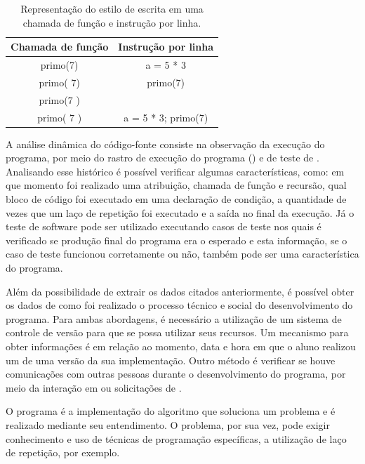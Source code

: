 			\begin{table}
				\centering
				\begin{tabular}{|c|c|}
					\hline
					Chamada de função & Instrução por linha \\ \hline
					primo(7)		  & a = 5 * 3  \\
					primo( 7)		 & primo(7)	 \\
					primo(7 )		 &	  \\
					primo( 7 )		& a = 5 * 3; primo(7)	\\
					\hline
				\end{tabular}
				\caption[Representação do estilo de escrita]{Representação do estilo
				de escrita em uma chamada de função e instrução por linha.}
				\label{tab:exemploEstEsc}
			\end{table}
			
			A análise dinâmica do código-fonte consiste na observação da execução do
			programa, por meio do rastro de execução
			do programa () e de teste de . Analisando esse histórico é
			possível verificar algumas características, como: em que momento foi realizado
			uma atribuição, chamada de função e recursão, qual bloco de código foi
			executado em uma declaração de condição, a quantidade de vezes que um laço
			de repetição foi executado e a saída no final da execução. Já o teste de
			software pode ser utilizado executando casos de teste nos quais é verificado
			se produção final do programa era o esperado e esta informação, se o caso de
			teste funcionou corretamente ou não, também pode ser uma característica do programa.
			
			Além da possibilidade de extrair os dados citados anteriormente, é possível
			obter os dados de como foi realizado o processo técnico e social do desenvolvimento
			do programa. Para ambas abordagens, é necessário a utilização de um sistema de
			controle de versão para que se possa utilizar seus recursos. Um mecanismo para
			obter informações é em relação ao momento, data e hora em que o aluno realizou
			um  de uma versão da sua implementação. Outro método é verificar
			se houve comunicações com outras pessoas durante o desenvolvimento do programa,
			por meio da interação em  ou solicitações de .
			
			O programa é a implementação do algoritmo que soluciona um problema e é realizado
			mediante seu entendimento. O problema, por sua vez, pode exigir conhecimento e
			uso de técnicas de programação específicas, a utilização de laço de repetição,
			por exemplo. 

